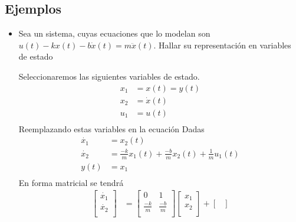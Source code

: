 \documentclass[12pt]{article}
\begin{document}
\subsection{Ejemplos}
\begin{itemize}
    \item Sea un sistema, cuyas ecuaciones que lo modelan son $u(t)-kx(t)-b\dot{x}(t)=m\ddot{x}(t)$. Hallar su representación en variables de estado
    
    Seleccionaremos las siguientes variables de estado.
    \begin{equation}
        \begin{split}
        x_{1}&=x(t)=y(t)\\
        x_{2}&=\dot{x}(t)\\
        u_{1}&=u(t)\\
        \label{eq:state_ejem1}
        \end{split}
    \end{equation}
    Reemplazando estas variables en la ecuación Dadas
    \begin{equation}
        \begin{split}
        \dot{x_{1}}&=x_{2}(t)\\
        \dot{x_{2}}&=\frac{-k}{m}x_{1}(t)+\frac{-b}{m}x_{2}(t)+\frac{1}{m}u_{1}(t)\\
        y(t)&=x_{1}\\
        \label{eq:state_ejem11}
        \end{split}
    \end{equation}
    En forma matricial se tendrá
    \begin{equation}
        \begin{split}
            \begin{bmatrix}
                \dot{x_{1}} \\
                \dot{x_{2}} \\
            \end{bmatrix}&=
            \begin{bmatrix}
                0 & 1 \\
                \frac{-k}{m} & \frac{-b}{m} \\
            \end{bmatrix}
            \begin{bmatrix}
                x_{1} \\
                x_{2} \\
            \end{bmatrix}+
            \begin{bmatrix}

\end{bmatrix}
\end{split}
\end{equation}
\end{itemize}
\end{document}
